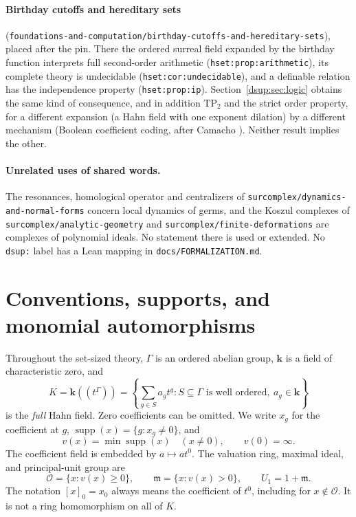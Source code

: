 \documentclass[11pt,oneside]{article}
\numberwithin{equation}{section}
\theoremstyle{definition}
\theoremstyle{remark}
\newcommand{\kk}{\mathbf k}
\newcommand{\OO}{\mathcal O}
\newcommand{\mm}{\mathfrak m}
\newcommand{\supp}{\operatorname{supp}}
\newcommand{\repo}[1]{\nolinkurl{#1}}%
\newcommand{\lbl}[1]{\nolinkurl{#1}}%
\begin{document}
\paragraph{Birthday cutoffs and hereditary sets}
(\repo{foundations-and-computation/birthday-cutoffs-and-hereditary-sets}),
placed after the pin. There the ordered surreal field expanded by the
birthday function interprets full second-order arithmetic
(\lbl{hset:prop:arithmetic}), its complete theory is undecidable
(\lbl{hset:cor:undecidable}), and a definable relation has the independence
property (\lbl{hset:prop:ip}). Section~\ref{dsup:sec:logic} obtains the same
kind of consequence, and in addition $\mathrm{TP}_2$ and the strict order
property, for a different expansion (a Hahn field with one exponent
dilation) by a different mechanism (Boolean coefficient coding, after
Camacho \cite{Camacho}). Neither result implies the other.

\paragraph{Unrelated uses of shared words.} The resonances, homological
operator and centralizers of \repo{surcomplex/dynamics-and-normal-forms}
concern local dynamics of germs, and the Koszul complexes of
\repo{surcomplex/analytic-geometry} and \repo{surcomplex/finite-deformations}
are complexes of polynomial ideals. No statement there is used or extended.
No \texttt{dsup:} label has a Lean mapping in \repo{docs/FORMALIZATION.md}.

\section{Conventions, supports, and monomial automorphisms}\label{dsup:sec:setup}

Throughout the set-sized theory, $\Gamma$ is an ordered abelian group,
$\kk$ is a field of characteristic zero, and
\[
 K=\kk((t^\Gamma))
 =\left\{\sum_{g\in S}a_gt^g:S\subseteq\Gamma
       \text{ is well ordered},\ a_g\in\kk\right\}
\]
is the \emph{full} Hahn field. Zero coefficients can be omitted. We write
$x_g$ for the coefficient at $g$, $\supp(x)=\{g:x_g\ne0\}$, and
\[
 v(x)=\min\supp(x)\quad(x\ne0),\qquad v(0)=\infty.
\]
The coefficient field is embedded by $a\mapsto at^0$. The valuation ring,
maximal ideal, and principal-unit group are
\[
 \OO=\{x:v(x)\ge0\},\qquad
 \mm=\{x:v(x)>0\},\qquad U_1=1+\mm.
\]
The notation $[x]_0=x_0$ always means the coefficient of $t^0$, including
for $x\notin\OO$. It is not a ring homomorphism on all of $K$.
\end{document}

